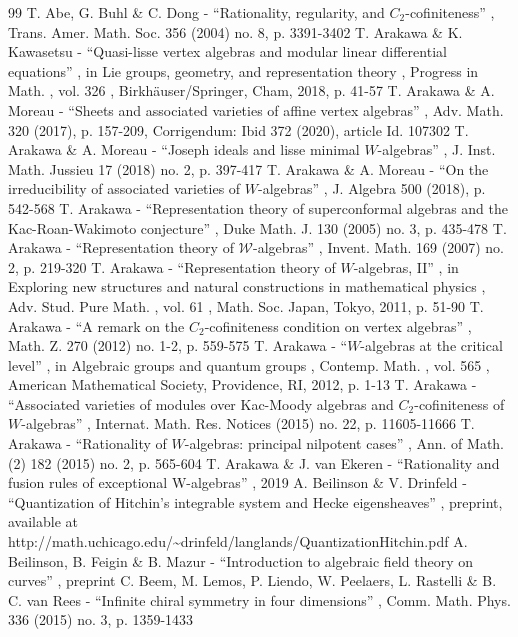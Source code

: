 \documentclass[11pt]{article}
\numberwithin{equation}{section}
\theoremstyle{definition}
\begin{document}
\begin{thebibliography}{99}
 T. Abe, G. Buhl \& C. Dong - “Rationality, regularity, and $C_2$-cofiniteness” , Trans. Amer. Math. Soc. 356 (2004) no. 8, p. 3391-3402
 T. Arakawa \& K. Kawasetsu - “Quasi-lisse vertex algebras and modular linear differential equations” , in Lie groups, geometry, and representation theory , Progress in Math. , vol. 326 , Birkhäuser/Springer, Cham, 2018, p. 41-57
 T. Arakawa \& A. Moreau - “Sheets and associated varieties of affine vertex algebras” , Adv. Math. 320 (2017), p. 157-209, Corrigendum: Ibid 372 (2020), article Id. 107302
 T. Arakawa \& A. Moreau - “Joseph ideals and lisse minimal $W$-algebras” , J. Inst. Math. Jussieu 17 (2018) no. 2, p. 397-417
 T. Arakawa \& A. Moreau - “On the irreducibility of associated varieties of $W$-algebras” , J. Algebra 500 (2018), p. 542-568
 T. Arakawa - “Representation theory of superconformal algebras and the Kac-Roan-Wakimoto conjecture” , Duke Math. J. 130 (2005) no. 3, p. 435-478
 T. Arakawa - “Representation theory of $\mathscr{W}$-algebras” , Invent. Math. 169 (2007) no. 2, p. 219-320
 T. Arakawa - “Representation theory of $W$-algebras, II” , in Exploring new structures and natural constructions in mathematical physics , Adv. Stud. Pure Math. , vol. 61 , Math. Soc. Japan, Tokyo, 2011, p. 51-90
 T. Arakawa - “A remark on the $C_2$-cofiniteness condition on vertex algebras” , Math. Z. 270 (2012) no. 1-2, p. 559-575
 T. Arakawa - “$W$-algebras at the critical level” , in Algebraic groups and quantum groups , Contemp. Math. , vol. 565 , American Mathematical Society, Providence, RI, 2012, p. 1-13
 T. Arakawa - “Associated varieties of modules over Kac-Moody algebras and $C_2$-cofiniteness of $W$-algebras” , Internat. Math. Res. Notices (2015) no. 22, p. 11605-11666
 T. Arakawa - “Rationality of $W$-algebras: principal nilpotent cases” , Ann. of Math. (2) 182 (2015) no. 2, p. 565-604
 T. Arakawa \& J. van Ekeren - “Rationality and fusion rules of exceptional W-algebras” , 2019
 A. Beilinson \& V. Drinfeld - “Quantization of Hitchin’s integrable system and Hecke eigensheaves” , preprint, available at http://math.uchicago.edu/\textasciitilde{}drinfeld/langlands/QuantizationHitchin.pdf
 A. Beilinson, B. Feigin \& B. Mazur - “Introduction to algebraic field theory on curves” , preprint
 C. Beem, M. Lemos, P. Liendo, W. Peelaers, L. Rastelli \& B. C. van Rees - “Infinite chiral symmetry in four dimensions” , Comm. Math. Phys. 336 (2015) no. 3, p. 1359-1433

\end{thebibliography}
\end{document}
